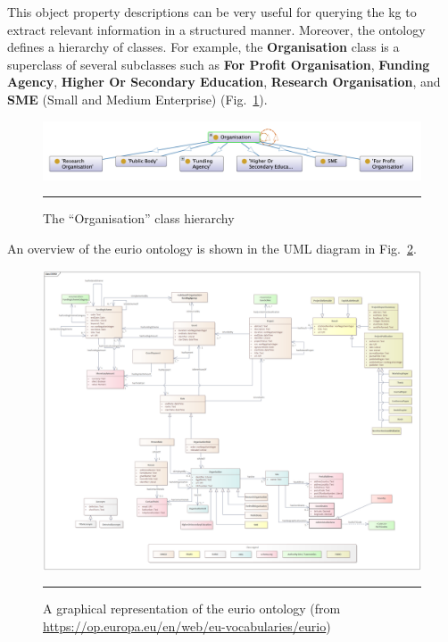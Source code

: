 This object property descriptions can be very useful for querying the \gls{kg} to extract relevant information in a structured manner.
Moreover, the ontology defines a hierarchy of classes.
For example, the \textbf{Organisation} class is a superclass of several subclasses such as \textbf{For Profit Organisation}, \textbf{Funding Agency}, \textbf{Higher Or Secondary Education}, \textbf{Research Organisation}, and \textbf{SME} (Small and Medium Enterprise) (Fig.~\ref{fig:organisation-class-hierarchy}).

\begin{figure}[htbp]
    \centering
 \includegraphics[width=.9\textwidth]{figures/architecture/organisation-class-hierarchy.png}
     \rule{35em}{0.5pt}
    \caption{The ``Organisation'' class hierarchy}
 \label{fig:organisation-class-hierarchy}
\end{figure}

An overview of the \gls{eurio} ontology is shown in the UML diagram in Fig.~\ref{fig:eurio-ontology}.

\begin{figure}[htbp]
    \centering
 \includegraphics[width=\textwidth]{figures/architecture/EURIO_V2.4.png}
     \rule{35em}{0.5pt}
    \caption{A graphical representation of the \gls{eurio} ontology (from \url{https://op.europa.eu/en/web/eu-vocabularies/eurio})}
 \label{fig:eurio-ontology}
\end{figure}

